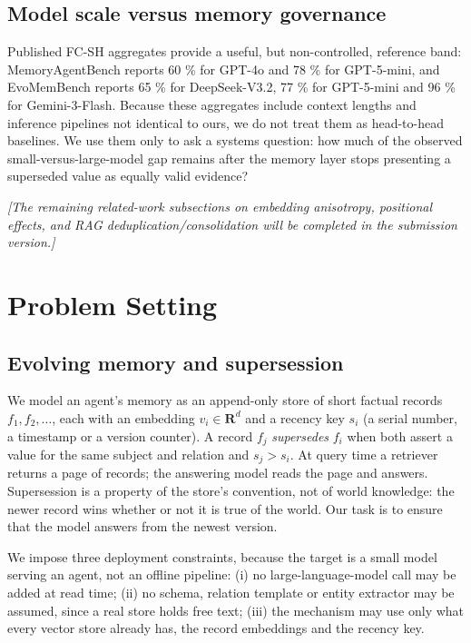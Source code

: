 \documentclass[journal=jcisd8,manuscript=article]{achemso}
\begin{document}
\subsection{Model scale versus memory governance}

Published FC-SH aggregates provide a useful, but non-controlled, reference band: MemoryAgentBench reports 60 \% for GPT-4o and 78 \% for GPT-5-mini, and EvoMemBench reports 65 \% for DeepSeek-V3.2, 77 \% for GPT-5-mini and 96 \% for Gemini-3-Flash. Because these aggregates include context lengths and inference pipelines not identical to ours, we do not treat them as head-to-head baselines. We use them only to ask a systems question: how much of the observed small-versus-large-model gap remains after the memory layer stops presenting a superseded value as equally valid evidence?

\emph{[The remaining related-work subsections on embedding anisotropy, positional effects, and RAG deduplication/consolidation will be completed in the submission version.]}

\section{Problem Setting}
\label{sec:problem}

\subsection{Evolving memory and supersession}

We model an agent's memory as an append-only store of short factual records $f_1,f_2,\dots$, each with an embedding $v_i\in\mathbf{R}^d$ and a recency key $s_i$ (a serial number, a timestamp or a version counter). A record $f_j$ \emph{supersedes} $f_i$ when both assert a value for the same subject and relation and $s_j>s_i$. At query time a retriever returns a page of records; the answering model reads the page and answers. Supersession is a property of the store's convention, not of world knowledge: the newer record wins whether or not it is true of the world. Our task is to ensure that the model answers from the newest version.

We impose three deployment constraints, because the target is a small model serving an agent, not an offline pipeline: (i) no large-language-model call may be added at read time; (ii) no schema, relation template or entity extractor may be assumed, since a real store holds free text; (iii) the mechanism may use only what every vector store already has, the record embeddings and the recency key.
\end{document}
